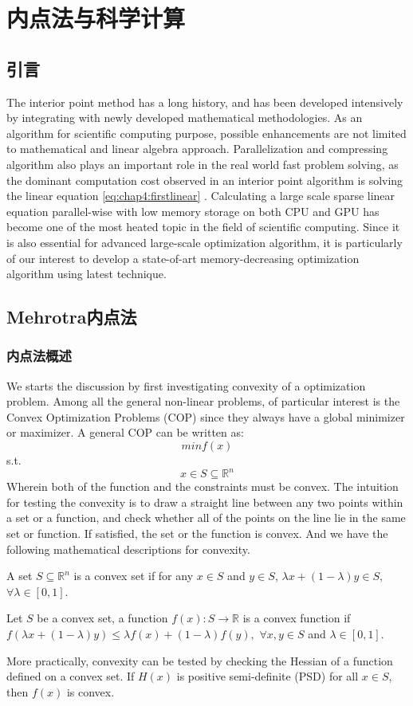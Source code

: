 \chapter{内点法与科学计算}
\section{引言}
The interior point method has a long history\parencite{Jacek}, and has been developed intensively by integrating with newly developed mathematical methodologies. As an algorithm for scientific computing purpose, possible enhancements are not limited to mathematical and linear algebra approach. Parallelization and compressing algorithm also plays an important role in the real world fast problem solving, as the dominant computation cost observed in an interior point algorithm is solving the linear equation \eqref{eq:chap4:firstlinear} \parencite{kang2015nonlinear}. Calculating a large scale sparse linear equation parallel-wise with low memory storage on both CPU and GPU has become one of the most heated topic in the field of scientific computing.  Since it is also essential for advanced large-scale optimization algorithm, it is particularly of our interest to develop a state-of-art memory-decreasing optimization algorithm using latest technique.
\section{Mehrotra内点法}
\subsection{内点法概述}
We starts the discussion by first investigating convexity of a optimization problem. Among all the general non-linear problems, of particular interest is the Convex Optimization Problems (COP) since they always have a global minimizer or maximizer. A general COP can be written as:
\begin{equation}
min f(x)
\end{equation}
s.t.
$$
x\in S \subseteq \mathbb{R}^n
$$
Wherein both of the function and the constraints must be convex. The intuition for testing the convexity is to draw a straight line between any two points within a set or a function, and check whether all of the points on the line lie in the same set or function. If satisfied, the set or the function is convex. And we have the following mathematical descriptions for convexity.
\begin{defn}\label{thm:1}
	A set $S\subseteq \mathbb{R}^n$ is a convex set if for any $x\in S$ and $y\in S$, $\lambda x+(1-\lambda)y\in S,$ $\forall \lambda \in [0,1]$.
\end{defn}
\begin{defn}\label{thm:2}
	Let $S$ be a convex set, a function $f(x):S\rightarrow \mathbb{R}$ is a convex function if $f(\lambda x+(1-\lambda)y)\leq \lambda f(x)+(1-\lambda)f(y),$ $\forall x,y \in S$ and $\lambda \in [0,1]$.
\end{defn}
More practically, convexity can be tested by checking the Hessian of a function defined on a convex set. If $H(x)$ is positive semi-definite (PSD) for all $x\in S$, then $f(x)$ is convex.

